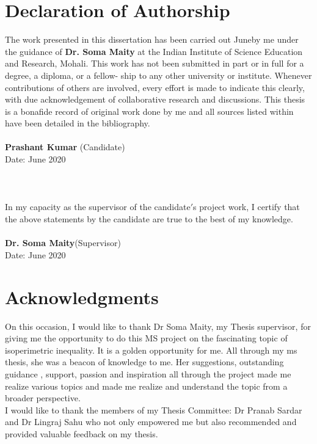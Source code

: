 \documentclass[oneside]{book}
\begin{document}
	\chapter*{Declaration of Authorship}
	The work presented in this dissertation has been carried out Juneby me under the guidance of \textbf{Dr. Soma Maity} at the Indian Institute of Science Education and Research, Mohali.
	This work has not been submitted in part or in full for a degree, a diploma, or a fellow- ship to any other university or institute. Whenever contributions of others are involved, every effort is made to indicate this clearly, with due acknowledgement of collaborative research and discussions. This thesis is a bonafide record of original work done by me and all sources listed within have been detailed in the bibliography.\\
	\\
	\textbf{Prashant Kumar} (Candidate)\\
	Date: June 2020\\
	\\
	\\
	\\
	In my capacity as the supervisor of the candidate$'$s project work, I certify that the above statements by the candidate are true to the best of my knowledge.\\
	\\
	\textbf{Dr. Soma Maity}(Supervisor)\\
	Date: June 2020
	\thispagestyle{empty}
	\chapter*{Acknowledgments}
	
	On this occasion, I would like to thank Dr Soma Maity, my Thesis supervisor, for giving me the opportunity to do this MS project on the fascinating topic of isoperimetric inequality. It is a golden opportunity for me. All through my ms thesis, she was a beacon of knowledge to me. 
	Her suggestions, outstanding guidance , support, passion and inspiration all through the project made me realize various topics and made me realize and understand the topic from a broader perspective. \\ 
	
	I would like to thank the members of my Thesis Committee: Dr Pranab Sardar and Dr Lingraj Sahu who not only empowered me but also recommended and provided valuable feedback on my thesis. \\
	
\end{document}
